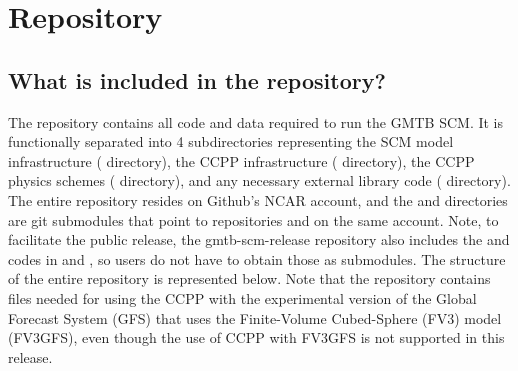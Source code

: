 \chapter{Repository}
\label{chapter: repository}

\section{What is included in the repository?}
The repository contains all code and data required to run the GMTB SCM. It is functionally separated into 4 subdirectories representing the SCM model infrastructure ( directory), the CCPP infrastructure ( directory), the CCPP physics schemes ( directory), and any necessary external library code ( directory). The entire  repository resides on Github's NCAR account, and the  and  directories are git submodules that point to repositories  and  on the same account. Note, to facilitate the public release, the gmtb-scm-release repository also includes the  and  codes in  and , so users do not have to obtain those as submodules. The structure of the entire repository is represented below. Note that the  repository contains files needed for using the CCPP with the experimental version of the Global Forecast System (GFS) that uses the Finite-Volume Cubed-Sphere (FV3) model (FV3GFS), even though the use of CCPP with FV3GFS is not supported in this release.

